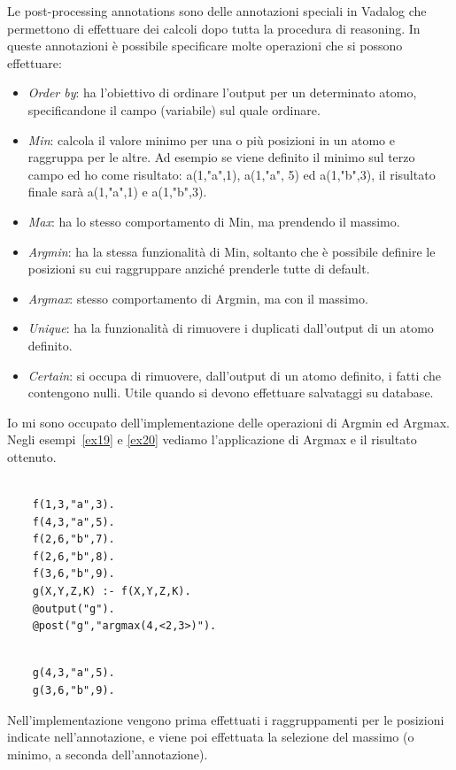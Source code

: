 Le post-processing annotations sono delle annotazioni speciali in Vadalog che permettono di effettuare dei calcoli dopo tutta la procedura di reasoning. 
In queste annotazioni è possibile specificare molte operazioni che si possono effettuare:
\begin{itemize}
	\item \emph{Order by}: ha l'obiettivo di ordinare l'output per un determinato atomo, specificandone il campo (variabile) sul quale ordinare.
	\item \emph{Min}: calcola il valore minimo per una o più posizioni in un atomo e raggruppa per le altre. Ad esempio se viene definito il minimo sul terzo campo ed ho come risultato: a(1,"a",1), a(1,"a", 5) ed a(1,"b",3), il risultato finale sarà a(1,"a",1) e  a(1,"b",3).
	\item \emph{Max}: ha lo stesso comportamento di Min, ma prendendo il massimo.
	\item \emph{Argmin}: ha la stessa funzionalità di Min, soltanto che è possibile definire le posizioni su cui raggruppare anziché prenderle tutte di default. 
	\item \emph{Argmax}: stesso comportamento di Argmin, ma con il massimo.
	\item \emph{Unique}: ha la funzionalità di rimuovere i duplicati dall'output di un atomo definito.
	\item \emph{Certain}: si occupa di rimuovere, dall'output di un atomo definito, i fatti che contengono nulli. Utile quando si devono effettuare salvataggi su database.
\end{itemize}
Io mi sono occupato dell'implementazione delle operazioni di Argmin ed Argmax. \newline
Negli esempi~\ref{ex19} e \ref{ex20} vediamo l'applicazione di Argmax e il risultato ottenuto.
\begin{example}\label{ex19}
	\begin{lstlisting}
		
	f(1,3,"a",3).
	f(4,3,"a",5).
	f(2,6,"b",7).
	f(2,6,"b",8).
	f(3,6,"b",9).
	g(X,Y,Z,K) :- f(X,Y,Z,K).
	@output("g").
	@post("g","argmax(4,<2,3>)").
	\end{lstlisting}
\end{example}
\begin{example}\label{ex20}
	\begin{lstlisting}
	
	g(4,3,"a",5).
	g(3,6,"b",9).
	\end{lstlisting}
\end{example}
Nell'implementazione vengono prima effettuati i raggruppamenti per le posizioni indicate nell'annotazione, e viene poi effettuata la selezione del massimo (o minimo, a seconda dell'annotazione). 

